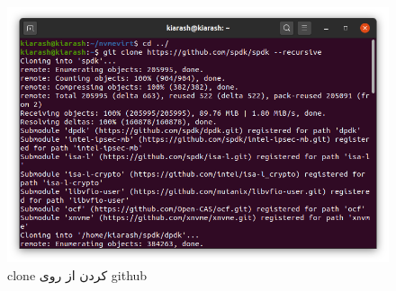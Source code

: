 \begin{figure}[H]
    \centering
    \includegraphics[width=\textwidth]{figs/gitclone.png}
    \caption{clone کردن از روی github}
\end{figure}


